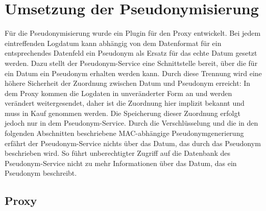 \section{Umsetzung der Pseudonymisierung} %

\label{sec_impl_pseudonymity}






Für die Pseudonymisierung wurde ein Plugin für den Proxy entwickelt. Bei jedem eintreffenden Logdatum kann abhängig von dem Datenformat für ein entsprechendes Datenfeld ein Pseudonym als Ersatz für das echte Datum gesetzt werden. Dazu stellt der Pseudonym-Service eine Schnittstelle bereit, über die für ein Datum ein Pseudonym erhalten werden kann. Durch diese Trennung wird eine höhere Sicherheit der Zuordnung zwischen Datum und Pseudonym erreicht: In dem Proxy kommen die Logdaten in unveränderter Form an und werden verändert weitergesendet, daher ist die Zuordnung hier implizit bekannt und muss in Kauf genommen werden. Die Speicherung dieser Zuordnung erfolgt jedoch nur in dem Pseudonym-Service. Durch die Verschlüsselung und die in den folgenden Abschnitten beschriebene MAC-abhängige Pseudonymgenerierung erfährt der Pseudonym-Service nichts über das Datum, das durch das Pseudonym beschrieben wird. So führt unberechtigter Zugriff auf die Datenbank des Pseudonym-Service nicht zu mehr Informationen über das Datum, das ein Pseudonym beschreibt.

\subsection{Proxy}

